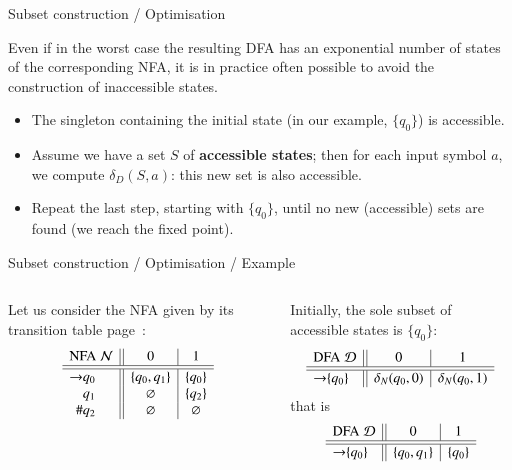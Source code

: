 %
\begin{frame}{Subset construction / Optimisation}

Even if in the worst case the resulting DFA has an exponential number
of states of the corresponding NFA, it is in practice often possible
to avoid the construction of inaccessible states.
\begin{itemize}

  \item The singleton containing the initial state (in our example,
  \(\{q_0\}\)) is accessible.

  \item Assume we have a set \(S\) of \textbf{accessible states}; then
    for each input symbol \(a\), we compute \(\delta_D(S,a)\): this
    new set is also accessible.

  \item Repeat the last step, starting with \(\{q_0\}\), until no
  new (accessible) sets are found (we reach the fixed point).

\end{itemize}

\end{frame}

%
\begin{frame}{Subset construction / Optimisation / Example}

\begin{columns}

   Let us consider the NFA given by its
  transition table page~\pageref{nfa_01_suffix_table}:
  \[
  \begin{array}{r@{}l||c|c}
    \multicolumn{2}{c||}{\text{NFA} \; {\cal N}} & 0 & 1\\
    \hline\hline
    \rightarrow & q_0 & \{q_0, q_1\} & \{q_0\}\\
                & q_1 & \varnothing  & \{q_2\}\\
    \#          & q_2 & \varnothing  & \varnothing
  \end{array}
  \]

   Initially, the sole subset of accessible
  states is \(\{q_0\}\):
  \[
  \begin{array}{r@{}l||c|c}
    \multicolumn{2}{c||}{\text{DFA} \; {\cal D}} & 0 & 1\\
    \hline\hline
    \rightarrow & \{q_0\} & \delta_N(q_0,0) & \delta_N(q_0,1)
  \end{array}
  \]
  that is
  \[
  \begin{array}{r@{}l||c|c}
    \multicolumn{2}{c||}{\text{DFA} \; {\cal D}} & 0 & 1\\
    \hline\hline
    \rightarrow & \{q_0\} & \{q_0,q_1\} & \{q_0\}
  \end{array}
  \]

\end{columns}

\end{frame}

